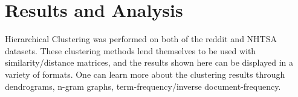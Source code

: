 \chapter{Results and Analysis}


\hspace*{0.3cm} Hierarchical Clustering was performed on both of the reddit and NHTSA datasets. These clustering methods lend themselves to be used with similarity/distance matrices, and the results shown here can be displayed in a variety of formats. One can learn more about the clustering results through dendrograms, n-gram graphs, term-frequency/inverse document-frequency.

